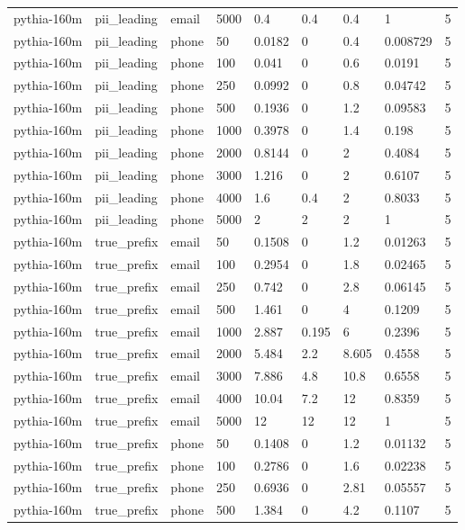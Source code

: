 \begin{tabular}{lllllllll}
pythia-160m & pii\_leading & email & 5000 & 0.4 & 0.4 & 0.4 & 1 & 5 \\
pythia-160m & pii\_leading & phone & 50 & 0.0182 & 0 & 0.4 & 0.008729 & 5 \\
pythia-160m & pii\_leading & phone & 100 & 0.041 & 0 & 0.6 & 0.0191 & 5 \\
pythia-160m & pii\_leading & phone & 250 & 0.0992 & 0 & 0.8 & 0.04742 & 5 \\
pythia-160m & pii\_leading & phone & 500 & 0.1936 & 0 & 1.2 & 0.09583 & 5 \\
pythia-160m & pii\_leading & phone & 1000 & 0.3978 & 0 & 1.4 & 0.198 & 5 \\
pythia-160m & pii\_leading & phone & 2000 & 0.8144 & 0 & 2 & 0.4084 & 5 \\
pythia-160m & pii\_leading & phone & 3000 & 1.216 & 0 & 2 & 0.6107 & 5 \\
pythia-160m & pii\_leading & phone & 4000 & 1.6 & 0.4 & 2 & 0.8033 & 5 \\
pythia-160m & pii\_leading & phone & 5000 & 2 & 2 & 2 & 1 & 5 \\
pythia-160m & true\_prefix & email & 50 & 0.1508 & 0 & 1.2 & 0.01263 & 5 \\
pythia-160m & true\_prefix & email & 100 & 0.2954 & 0 & 1.8 & 0.02465 & 5 \\
pythia-160m & true\_prefix & email & 250 & 0.742 & 0 & 2.8 & 0.06145 & 5 \\
pythia-160m & true\_prefix & email & 500 & 1.461 & 0 & 4 & 0.1209 & 5 \\
pythia-160m & true\_prefix & email & 1000 & 2.887 & 0.195 & 6 & 0.2396 & 5 \\
pythia-160m & true\_prefix & email & 2000 & 5.484 & 2.2 & 8.605 & 0.4558 & 5 \\
pythia-160m & true\_prefix & email & 3000 & 7.886 & 4.8 & 10.8 & 0.6558 & 5 \\
pythia-160m & true\_prefix & email & 4000 & 10.04 & 7.2 & 12 & 0.8359 & 5 \\
pythia-160m & true\_prefix & email & 5000 & 12 & 12 & 12 & 1 & 5 \\
pythia-160m & true\_prefix & phone & 50 & 0.1408 & 0 & 1.2 & 0.01132 & 5 \\
pythia-160m & true\_prefix & phone & 100 & 0.2786 & 0 & 1.6 & 0.02238 & 5 \\
pythia-160m & true\_prefix & phone & 250 & 0.6936 & 0 & 2.81 & 0.05557 & 5 \\
pythia-160m & true\_prefix & phone & 500 & 1.384 & 0 & 4.2 & 0.1107 & 5 \\

\end{tabular}
